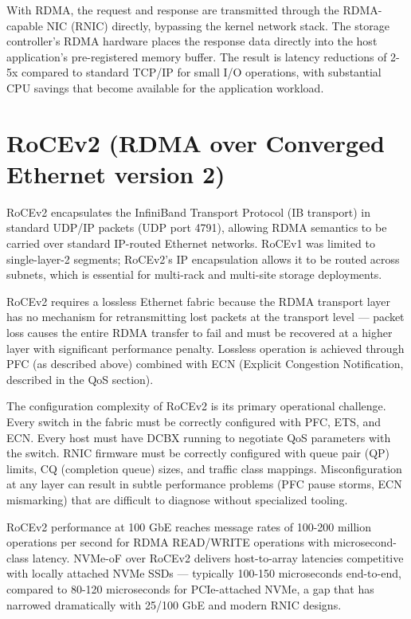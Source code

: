 With RDMA, the request and response are transmitted through the RDMA-capable NIC (RNIC) directly, bypassing the kernel network stack. The storage controller's RDMA hardware places the response data directly into the host application's pre-registered memory buffer. The result is latency reductions of 2-5x compared to standard TCP/IP for small I/O operations, with substantial CPU savings that become available for the application workload.

\section{RoCEv2 (RDMA over Converged Ethernet version 2)}
RoCEv2 encapsulates the InfiniBand Transport Protocol (IB transport) in standard UDP/IP packets (UDP port 4791), allowing RDMA semantics to be carried over standard IP-routed Ethernet networks. RoCEv1 was limited to single-layer-2 segments; RoCEv2's IP encapsulation allows it to be routed across subnets, which is essential for multi-rack and multi-site storage deployments.

RoCEv2 requires a lossless Ethernet fabric because the RDMA transport layer has no mechanism for retransmitting lost packets at the transport level --- packet loss causes the entire RDMA transfer to fail and must be recovered at a higher layer with significant performance penalty. Lossless operation is achieved through PFC (as described above) combined with ECN (Explicit Congestion Notification, described in the QoS section).

The configuration complexity of RoCEv2 is its primary operational challenge. Every switch in the fabric must be correctly configured with PFC, ETS, and ECN. Every host must have DCBX running to negotiate QoS parameters with the switch. RNIC firmware must be correctly configured with queue pair (QP) limits, CQ (completion queue) sizes, and traffic class mappings. Misconfiguration at any layer can result in subtle performance problems (PFC pause storms, ECN mismarking) that are difficult to diagnose without specialized tooling.

RoCEv2 performance at 100 GbE reaches message rates of 100-200 million operations per second for RDMA READ/WRITE operations with microsecond-class latency. NVMe-oF over RoCEv2 delivers host-to-array latencies competitive with locally attached NVMe SSDs --- typically 100-150 microseconds end-to-end, compared to 80-120 microseconds for PCIe-attached NVMe, a gap that has narrowed dramatically with 25/100 GbE and modern RNIC designs.

